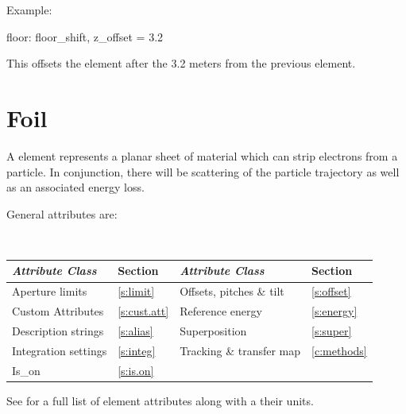 Example: 
\begin{example}
  floor: floor_shift, z_offset = 3.2
\end{example}
This offsets the element after the  3.2 meters from the previous
element.

\newpage

\section{Foil}
\label{s:foil}

A  element represents a planar sheet of material which can strip electrons from a particle.
In conjunction, there will be scattering of the particle trajectory as well as an associated energy
loss.

General  attributes are:
\begin{center}
\tt
\begin{tabular}{llll} \toprule
  {\sl Attribute Class}      & Section           & {\sl Attribute Class}      & Section            \\ \midrule
  Aperture limits            & \ref{s:limit}     & Offsets, pitches \& tilt   & \ref{s:offset}     \\
  Custom Attributes          & \ref{s:cust.att}  & Reference energy           & \ref{s:energy}     \\ 
  Description strings        & \ref{s:alias}     & Superposition              & \ref{s:super}      \\
  Integration settings       & \ref{s:integ}     & Tracking \& transfer map   & \ref{c:methods}    \\ 
  Is_on                      & \ref{s:is.on}     &                            &                    \\
  \bottomrule
\end{tabular}
\end{center}
\toffset
See  for a full list of element attributes along with a their units.


